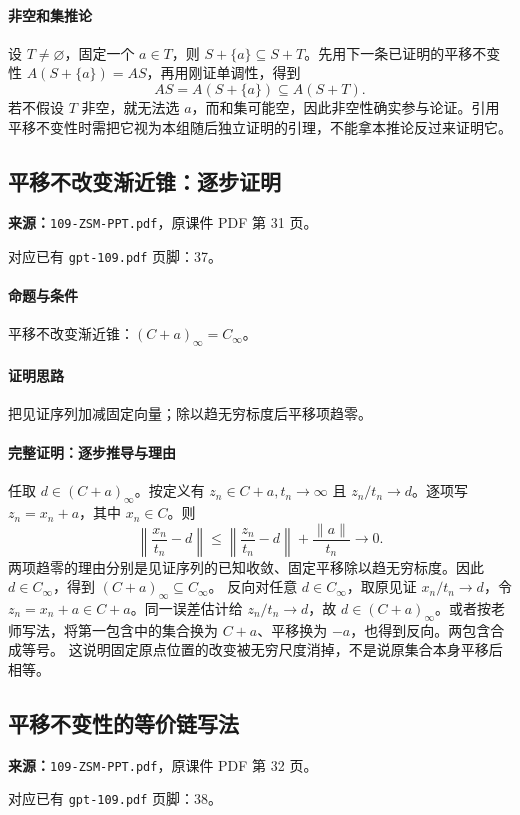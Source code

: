 \paragraph{非空和集推论}设 $T\ne\varnothing$，固定一个 $a\in T$，则 $S+\{a\}\subseteq S+T$。先用下一条已证明的平移不变性 $A(S+\{a\})=AS$，再用刚证单调性，得到
\[AS=A(S+\{a\})\subseteq A(S+T).\]
若不假设 $T$ 非空，就无法选 $a$，而和集可能空，因此非空性确实参与论证。引用平移不变性时需把它视为本组随后独立证明的引理，不能拿本推论反过来证明它。

\clearpage\subsection{平移不改变渐近锥：逐步证明}
\textbf{来源：}\texttt{109-ZSM-PPT.pdf}，原课件 PDF 第 31 页。\par
对应已有 \texttt{gpt-109.pdf} 页脚：37。\par
\paragraph{命题与条件}平移不改变渐近锥：$(C+a)_\infty=C_\infty$。
\paragraph{证明思路}把见证序列加减固定向量；除以趋无穷标度后平移项趋零。
\paragraph{完整证明：逐步推导与理由}

任取 $d\in(C+a)_\infty$。按定义有 $z_n\in C+a,t_n\to\infty$ 且 $z_n/t_n\to d$。逐项写 $z_n=x_n+a$，其中 $x_n\in C$。则
\[\left\|\frac{x_n}{t_n}-d\right\|\le\left\|\frac{z_n}{t_n}-d\right\|+\frac{\|a\|}{t_n}\to0.\]
两项趋零的理由分别是见证序列的已知收敛、固定平移除以趋无穷标度。因此 $d\in C_\infty$，得到 $(C+a)_\infty\subseteq C_\infty$。
反向对任意 $d\in C_\infty$，取原见证 $x_n/t_n\to d$，令 $z_n=x_n+a\in C+a$。同一误差估计给 $z_n/t_n\to d$，故 $d\in(C+a)_\infty$。或者按老师写法，将第一包含中的集合换为 $C+a$、平移换为 $-a$，也得到反向。两包含合成等号。
这说明固定原点位置的改变被无穷尺度消掉，不是说原集合本身平移后相等。

\clearpage\subsection{平移不变性的等价链写法}
\textbf{来源：}\texttt{109-ZSM-PPT.pdf}，原课件 PDF 第 32 页。\par
对应已有 \texttt{gpt-109.pdf} 页脚：38。\par

